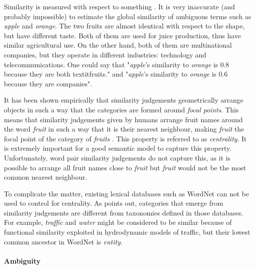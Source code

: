\documentclass[11pt]{article}
\begin{document}

Similarity is measured with respect to something \cite{}. It is very inaccurate (and probably impossible) to estimate the global similarity of ambiguous terms such as \textit{apple} and \textit{orange}. The two fruits are almost identical with respect to the shape, but have different taste. Both of them are used for juice production, thus have similar agricultural use. On the other hand, both of them are multinational companies, but they operate in different industries: technology and telecommunications. One could say that "\textit{apple}'s similarity to \textit{orange} is 0.8 because they are both textit{fruits}." and "\textit{apple}'s similarity to \textit{orange} is 0.6 because they are companies".

It has been shown empirically that similarity judgements geometrically arrange objects in such a way that the categories are formed around \emph{focal points}. This means that similarity judgements given by humans arrange fruit names around the word \textit{fruit} in such a way that it is their nearest neighbour, making \textit{fruit} the focal point of the category of \textit{fruits} \cite{1986-13502-00119860101}. This property is referred to as \emph{centrality}.
%
It is extremely important for a good semantic model to capture this property. Unfortunately, word pair similarity judgements do not capture this, as it is possible to arrange all fruit names close to \textit{fruit} but \textit{fruit} would not be the most common nearest neighbour. 

To complicate the matter, existing lexical databases such as WordNet \cite{Miller:1995:WLD:219717.219748} can not be used to control for centrality. As  points out, categories that emerge from similarity judgements are different from taxonomies defined in those databases. For example, \textit{traffic} and \textit{water} might be considered to be similar because of functional similarity exploited in hydrodynamic models of traffic, but their lowest common ancestor in WordNet is \textit{entity}.

\paragraph{Ambiguity}
\end{document}

